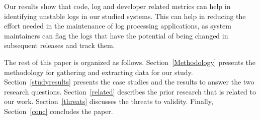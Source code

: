  
 Our results show that code, log and developer related metrics can help in identifying unstable logs in our studied systems. This can help in reducing the effort needed in the maintenance of log processing applications, as system maintainers can flag the logs that have the potential of being changed in subsequent releases and track them. 
 
The rest of this paper is organized as follows. Section~\ref{Methodology} presents the methodology for gathering and extracting data for our study. Section~\ref{studyresults} presents the case studies and the results to answer the two research questions. Section~\ref{related} describes the prior research that is related to our work. Section~\ref{threats} discusses the threats to validity. Finally, Section~\ref{conc} concludes the paper.
 
 
